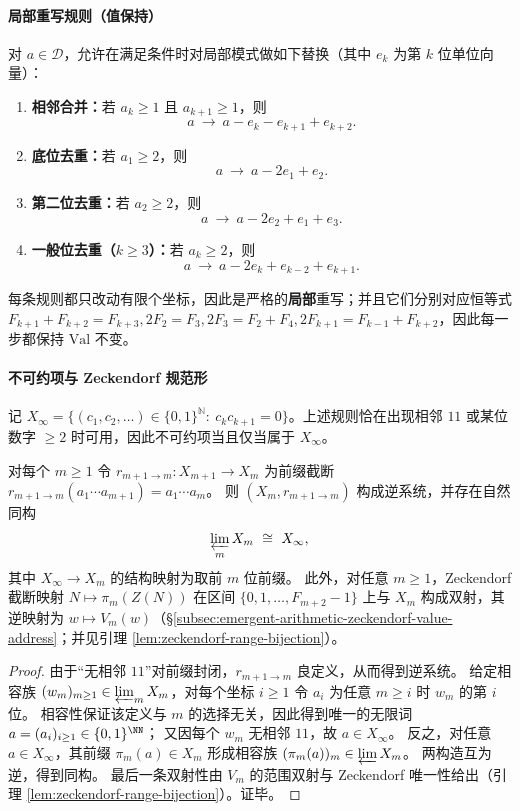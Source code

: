 \paragraph{局部重写规则（值保持）}
对 $a\in\mathcal{D}$，允许在满足条件时对局部模式做如下替换（其中 $e_k$ 为第 $k$ 位单位向量）：
\begin{enumerate}
  \renewcommand{\theenumi}{R\arabic{enumi}}
  \renewcommand{\labelenumi}{(\theenumi)}
  \item \label{rule:fold:adj}\textbf{相邻合并：}若 $a_k\ge 1$ 且 $a_{k+1}\ge 1$，则
  \[
  a\ \to\ a-e_k-e_{k+1}+e_{k+2}.
  \]
  \item \label{rule:fold:dedup1}\textbf{底位去重：}若 $a_1\ge 2$，则
  \[
  a\ \to\ a-2e_1+e_2.
  \]
  \item \label{rule:fold:dedup2}\textbf{第二位去重：}若 $a_2\ge 2$，则
  \[
  a\ \to\ a-2e_2+e_1+e_3.
  \]
  \item \label{rule:fold:dedupk}\textbf{一般位去重（$k\ge 3$）：}若 $a_k\ge 2$，则
  \[
  a\ \to\ a-2e_k+e_{k-2}+e_{k+1}.
  \]
\end{enumerate}
每条规则都只改动有限个坐标，因此是严格的\textbf{局部}重写；并且它们分别对应恒等式
\(
F_{k+1}+F_{k+2}=F_{k+3},
2F_2=F_3,
2F_3=F_2+F_4,
2F_{k+1}=F_{k-1}+F_{k+2}
\)，因此每一步都保持 $\mathrm{Val}$ 不变。

\paragraph{不可约项与 Zeckendorf 规范形}
记 $X_\infty=\{(c_1,c_2,\dots)\in\{0,1\}^{\mathbb{N}}:\ c_kc_{k+1}=0\}$。上述规则恰在出现相邻 $11$ 或某位数字 $\ge 2$ 时可用，因此不可约项当且仅当属于 $X_\infty$。

\begin{proposition}[分辨率稳定类型的逆极限本体]\label{prop:fold-inverse-limit-xm-xinfty}
对每个 \(m\ge 1\) 令 \(r_{m+1\to m}:X_{m+1}\to X_m\) 为前缀截断 \(r_{m+1\to m}(a_1\cdots a_{m+1})=a_1\cdots a_m\)。
则 \((X_m,r_{m+1\to m})\) 构成逆系统，并存在自然同构
\[
\varprojlim_m X_m\ \cong\ X_\infty,
\]
其中 \(X_\infty\to X_m\) 的结构映射为取前 \(m\) 位前缀。
此外，对任意 \(m\ge 1\)，Zeckendorf 截断映射
\(
N\mapsto \pi_m(Z(N))
\)
在区间 \(\{0,1,\dots,F_{m+2}-1\}\) 上与 \(X_m\) 构成双射，其逆映射为 \(w\mapsto V_m(w)\)（\S\ref{subsec:emergent-arithmetic-zeckendorf-value-address}；并见引理 \ref{lem:zeckendorf-range-bijection}）。
\end{proposition}
\begin{proof}
由于“无相邻 \(11\)”对前缀封闭，\(r_{m+1\to m}\) 良定义，从而得到逆系统。
给定相容族 \((w_m)_{m\ge 1}\in\varprojlim_m X_m\)，对每个坐标 \(i\ge 1\) 令 \(a_i\) 为任意 \(m\ge i\) 时 \(w_m\) 的第 \(i\) 位。
相容性保证该定义与 \(m\) 的选择无关，因此得到唯一的无限词 \(a=(a_i)_{i\ge 1}\in\{0,1\}^{\NN}\)；
又因每个 \(w_m\) 无相邻 \(11\)，故 \(a\in X_\infty\)。
反之，对任意 \(a\in X_\infty\)，其前缀 \(\pi_m(a)\in X_m\) 形成相容族 \((\pi_m(a))_m\in\varprojlim X_m\)。
两构造互为逆，得到同构。
最后一条双射性由 \(V_m\) 的范围双射与 Zeckendorf 唯一性给出（引理 \ref{lem:zeckendorf-range-bijection}）。证毕。
\end{proof}

